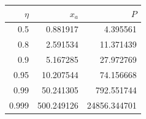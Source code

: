 \begin{ruledtabular}
\begin{tabular}{rrr}
$\eta$ & $x_a$ & $P$ \\
\hline
0.5 & 0.881917 & 4.395561 \\
0.8 & 2.591534 & 11.371439 \\
0.9 & 5.167285 & 27.972769 \\
0.95 & 10.207544 & 74.156668 \\
0.99 & 50.241305 & 792.551744 \\
0.999 & 500.249126 & 24856.344701 \\
\end{tabular}
\end{ruledtabular}
